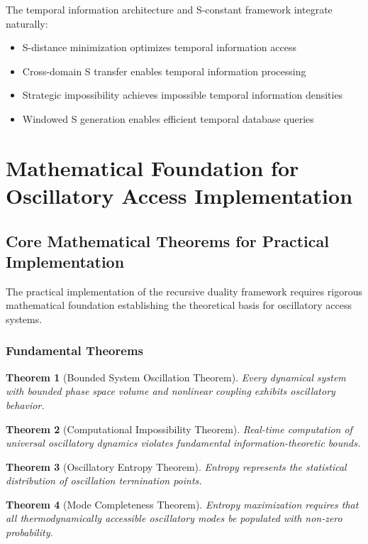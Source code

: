 \documentclass[12pt,a4paper]{article}
\newtheorem{theorem}{Theorem}[section]
\begin{document}
{The temporal information architecture and S-constant framework integrate naturally:

\begin{itemize}
\item S-distance minimization optimizes temporal information access
\item Cross-domain S transfer enables temporal information processing
\item Strategic impossibility achieves impossible temporal information densities
\item Windowed S generation enables efficient temporal database queries
\end{itemize}

\section{Mathematical Foundation for Oscillatory Access Implementation}

\subsection{Core Mathematical Theorems for Practical Implementation}

The practical implementation of the recursive duality framework requires rigorous mathematical foundation establishing the theoretical basis for oscillatory access systems.

\subsubsection{Fundamental Theorems}

\begin{theorem}[Bounded System Oscillation Theorem]
Every dynamical system with bounded phase space volume and nonlinear coupling exhibits oscillatory behavior.
\end{theorem}

\begin{theorem}[Computational Impossibility Theorem]
Real-time computation of universal oscillatory dynamics violates fundamental information-theoretic bounds.
\end{theorem}

\begin{theorem}[Oscillatory Entropy Theorem]
Entropy represents the statistical distribution of oscillation termination points.
\end{theorem}

\begin{theorem}[Mode Completeness Theorem]
Entropy maximization requires that all thermodynamically accessible oscillatory modes be populated with non-zero probability.
\end{theorem}

}
\end{document}
